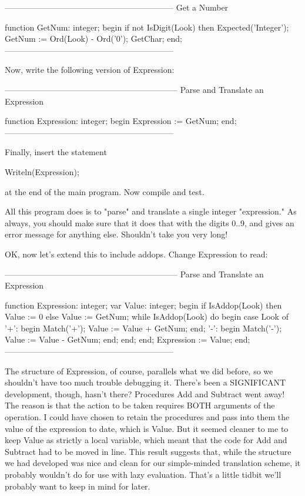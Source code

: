 \documentclass[float=false, crop=false]{standalone}
\begin{document}
\begin{code}
{--------------------------------------------------------------}
{ Get a Number }

function GetNum: integer;
begin
   if not IsDigit(Look) then Expected('Integer');
   GetNum := Ord(Look) - Ord('0');
   GetChar;
end;
{--------------------------------------------------------------}
\end{code}

Now, write the following version of Expression:

\begin{code}
{---------------------------------------------------------------}
{ Parse and Translate an Expression }

function Expression: integer;
begin
   Expression := GetNum;
end;
{--------------------------------------------------------------}
\end{code}


Finally, insert the statement

\begin{code}
   Writeln(Expression);
\end{code}

at the end of the main program. Now compile and test.

All this program does is to "parse" and translate a single integer "expression."
As always, you should make sure that it does that with the digits 0..9, and
gives an error message for anything else. Shouldn't take you very long!

OK, now let's extend this to include addops. Change Expression to read:

\begin{code}
{---------------------------------------------------------------}
{ Parse and Translate an Expression }

function Expression: integer;
var Value: integer;
begin
   if IsAddop(Look) then
      Value := 0
   else
      Value := GetNum;
   while IsAddop(Look) do begin
      case Look of
       '+': begin
               Match('+');
               Value := Value + GetNum;
            end;
       '-': begin
               Match('-');
               Value := Value - GetNum;
            end;
      end;
   end;
   Expression := Value;
end;
{--------------------------------------------------------------}
\end{code}

The structure of Expression, of course, parallels what we did before, so we
shouldn't have too much trouble debugging it. There's been a SIGNIFICANT
development, though, hasn't there? Procedures Add and Subtract went away! The
reason is that the action to be taken requires BOTH arguments of the operation.
I could have chosen to retain the procedures and pass into them the value of the
expression to date, which is Value. But it seemed cleaner to me to keep Value as
strictly a local variable, which meant that the code for Add and Subtract had to
be moved in line. This result suggests that, while the structure we had
developed was nice and clean for our simple-minded translation scheme, it
probably wouldn't do for use with lazy evaluation. That's a little tidbit we'll
probably want to keep in mind for later.
\end{document}
